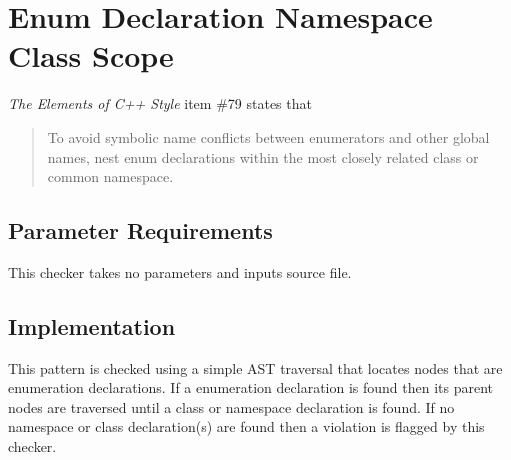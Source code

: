 %
%

\section{Enum Declaration Namespace Class Scope}
\label{EnumDeclarationNamespaceClassScope::overview}

{\it The Elements of C++ Style} item \#79 states that
\begin{quote}
To avoid symbolic name conflicts between enumerators and other global names, nest enum declarations within the most closely related class or common namespace.
\end{quote}

\subsection{Parameter Requirements}
This checker takes no parameters and inputs source file.

\subsection{Implementation}
This pattern is checked using a simple AST traversal that locates nodes that are enumeration declarations. If a enumeration declaration is found then its parent nodes are traversed until a class or namespace declaration is found. If no namespace or class declaration(s) are found then a violation is flagged by this checker.


